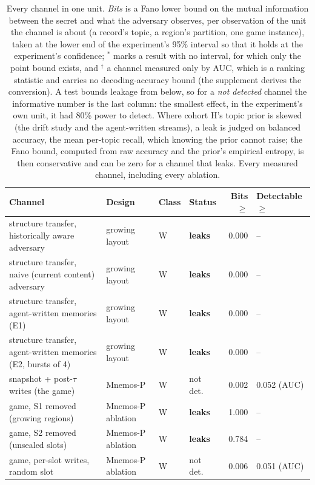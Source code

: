 \begin{table}[t]
\centering
\caption{Every channel in one unit. \emph{Bits} is a Fano lower bound on the mutual information between the secret and what the adversary observes, per observation of the unit the channel is about (a record's topic, a region's partition, one game instance), taken at the lower end of the experiment's 95\% interval so that it holds at the experiment's confidence; $^\ast$ marks a result with no interval, for which only the point bound exists, and $^\dagger$ a channel measured only by AUC, which is a ranking statistic and carries no decoding-accuracy bound (the supplement derives the conversion). A test bounds leakage from below, so for a \emph{not detected} channel the informative number is the last column: the smallest effect, in the experiment's own unit, it had 80\% power to detect. Where cohort H's topic prior is skewed (the drift study and the agent-written streams), a leak is judged on balanced accuracy, the mean per-topic recall, which knowing the prior cannot raise; the Fano bound, computed from raw accuracy and the prior's empirical entropy, is then conservative and can be zero for a channel that leaks. Every measured channel, including every ablation.}
\label{tab:supp-ledger}
\footnotesize
\setlength{\tabcolsep}{4pt}
\begin{tabular}{llllrl}
\toprule
Channel & Design & Class & Status & Bits $\geq$ & Detectable $\geq$ \\
\midrule
structure transfer, historically aware adversary & growing layout & W & \textbf{leaks} & 0.000 & -- \\
structure transfer, naive (current content) adversary & growing layout & W & \textbf{leaks} & 0.000 & -- \\
structure transfer, agent-written memories (E1) & growing layout & W & \textbf{leaks} & 0.000 & -- \\
structure transfer, agent-written memories (E2, bursts of 4) & growing layout & W & \textbf{leaks} & 0.000 & -- \\
snapshot + post-$\tau$ writes (the game) & Mnemos-P & W & not det. & 0.002 & 0.052 (AUC) \\
game, S1 removed (growing regions) & Mnemos-P ablation & W & \textbf{leaks} & 1.000 & -- \\
game, S2 removed (unsealed slots) & Mnemos-P ablation & W & \textbf{leaks} & 0.784 & -- \\
game, per-slot writes, random slot & Mnemos-P ablation & W & not det. & 0.006 & 0.051 (AUC) \\

\end{tabular}
\end{table}
